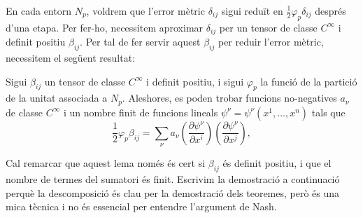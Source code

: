 En cada entorn $N_p$, voldrem que l'error mètric $\delta_{ij}$ sigui reduït en $\frac12\varphi_p\delta_{ij}$ després d'una etapa. Per fer-ho, necessitem aproximar $\delta_{ij}$ per un tensor de classe $C^\infty$ i definit positiu $\beta_{ij}$. Per tal de fer servir aquest $\beta_{ij}$ per reduir l'error mètric, necessitem el següent resultat:
\begin{lema}
    Sigui $\beta_{ij}$ un tensor de classe $C^\infty$ i definit positiu, i sigui $\varphi_p$ la funció de la partició de la unitat associada a $N_p$. Aleshores, es poden trobar funcions no-negatives $a_\nu$ de classe $C^\infty$ i un nombre finit de funcions lineals $\psi^\nu = \psi^\nu(x^1, \dots, x^n)$ tals que
\begin{equation}\label{eq:lema_descomp}
    \frac12\varphi_p\beta_{ij} = \sum_\nu a_\nu \left(\frac{\partial\psi^\nu}{\partial x^i}\right)\left(\frac{\partial\psi^\nu}{\partial x^j}\right),
\end{equation}
\end{lema}
\begin{obss}
    Cal remarcar que aquest lema només és cert si $\beta_{ij}$ és definit positiu, i que el nombre de termes del sumatori és finit. Escrivim la demostració a continuació perquè la descomposició és clau per la demostració dels teoremes, però és una mica tècnica i no és essencial per entendre l'argument de Nash.
\end{obss}
